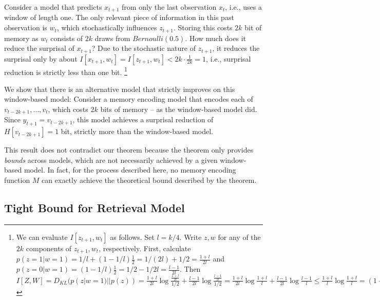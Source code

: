 \documentclass[11pt,letterpaper]{article}
\newcounter{theorem}
\begin{document}
Consider a model that predicts $x_{t+1}$ from only the last observation $x_t$, i.e., uses a window of length one.
The only relevant piece of information in this past observation is $w_t$, which stochastically influences $z_{t+1}$.
Storing this costs $2k$ bit of memory as $w_t$ consists of $2k$ draws from $Bernoulli(0.5)$.
How much does it reduce the surprisal of $x_{t+1}$?
Due to the stochastic nature of $z_{t+1}$, it reduces the surprisal only by about $I[x_{t+1}, w_t] = I[z_{t+1}, w_t] < 2k \cdot \frac{1}{2k} = 1$, i.e., surprisal reduction is strictly less than one bit.
\footnote{We can evaluate $I[z_{t+1}, w_t]$ as follows. Set $l = k/4$. Write $z, w$ for any of the $2k$ components of $z_{t+1}, w_t$, respectively. First, calculate $p(z = 1|w=1) = 1/l + (1-1/l) \frac{1}{2} = 1/(2l) + 1/2 = \frac{1+l}{2l}$ and $p(z = 0|w=1) = (1-1/l) \frac{1}{2} = 1/2 - 1/2l = \frac{l-1}{2l}$.
Then $I[Z, W] = D_{KL}(p(z|w=1)||p(z)) = \frac{1+l}{2l} \log \frac{\frac{1+l}{2l}}{1/2} + \frac{l-1}{2l} \log \frac{\frac{l-1}{2l}}{1/2}  = \frac{1+l}{2l} \log \frac{1+l}{l} + \frac{l-1}{2l} \log \frac{l-1}{l}  \leq \frac{1+l}{l} \log \frac{1+l}{l} =  (1+1/l) \log (1+1/l)  \leq  (1+1/l) (1/l) = 1/l + 1/l^2 < 2/l = \frac{1}{2k}.$
}

We show that there is an alternative model that strictly improves on this window-based model:
Consider a memory encoding model that encodes each of $v_{t-2k+1}, \dots, v_{t}$, which costs $2k$ bits of memory -- as the window-based model did.
Since $y_{t+1} = v_{t-2k+1}$, this model achieves a surprisal reduction of $H[v_{t-2k+1}] = 1$ bit, strictly more than the window-based model.


This result does not contradict our theorem because the theorem only provides \emph{bounds} across models, which are not necessarily achieved by a given window-based model.
In fact, for the process described here, no memory encoding function $M$ can exactly achieve the theoretical bound described by the theorem.



\subsection{Tight Bound for Retrieval Model}
\end{document}
